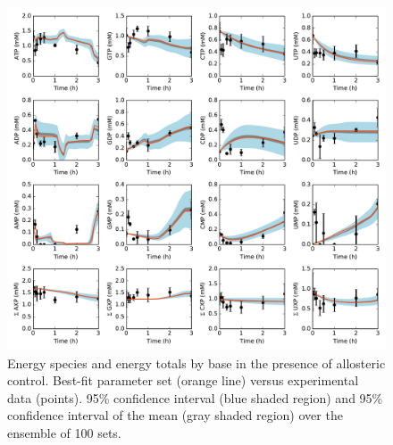 \documentclass[12pt]{article}
\begin{document}
\begin{figure}[ht]
\centering
\includegraphics[width=1.00\textwidth]{./Figures/Energy.pdf}
\caption{Energy species and energy totals by base in the presence of allosteric control. Best-fit parameter set (orange line) versus experimental data (points). 95\% confidence interval (blue shaded region) and 95\% confidence interval of the mean (gray shaded region) over the ensemble of 100 sets.}
\label{fig:Energy}
\end{figure}
\end{document}
